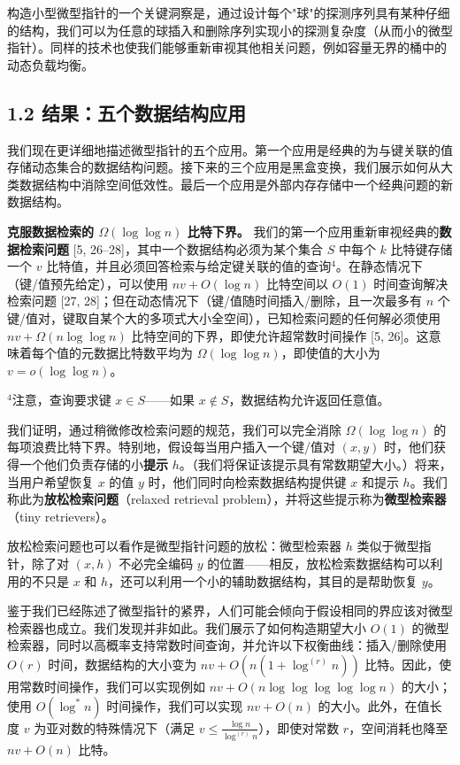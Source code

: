 \documentclass[12pt,a4paper]{ctexart}
\theoremstyle{remark}
\begin{document}
构造小型微型指针的一个关键洞察是，通过设计每个"球"的探测序列具有某种仔细的结构，我们可以为任意的球插入和删除序列实现小的探测复杂度（从而小的微型指针）。同样的技术也使我们能够重新审视其他相关问题，例如容量无界的桶中的动态负载均衡。

\subsection{1.2 结果：五个数据结构应用}
我们现在更详细地描述微型指针的五个应用。第一个应用是经典的为与键关联的值存储动态集合的数据结构问题。接下来的三个应用是黑盒变换，我们展示如何从大类数据结构中消除空间低效性。最后一个应用是外部内存存储中一个经典问题的新数据结构。

\textbf{克服数据检索的 $\Omega(\log\log n)$ 比特下界。} 我们的第一个应用重新审视经典的\textbf{数据检索问题} [5, 26–28]，其中一个数据结构必须为某个集合 $S$ 中每个 $k$ 比特键存储一个 $v$ 比特值，并且必须回答检索与给定键关联的值的查询$^4$。在静态情况下（键/值预先给定），可以使用 $nv+O(\log n)$ 比特空间以 $O(1)$ 时间查询解决检索问题 [27, 28]；但在动态情况下（键/值随时间插入/删除，且一次最多有 $n$ 个键/值对，键取自某个大的多项式大小全空间），已知检索问题的任何解必须使用 $nv+\Omega(n\log\log n)$ 比特空间的下界，即使允许超常数时间操作 [5, 26]。这意味着每个值的元数据比特数平均为 $\Omega(\log\log n)$，即使值的大小为 $v=o(\log\log n)$。

$^4$注意，查询要求键 $x\in S$——如果 $x\notin S$，数据结构允许返回任意值。

我们证明，通过稍微修改检索问题的规范，我们可以完全消除 $\Omega(\log\log n)$ 的每项浪费比特下界。特别地，假设每当用户插入一个键/值对 $(x,y)$ 时，他们获得一个他们负责存储的小\textbf{提示} $h$。（我们将保证该提示具有常数期望大小。）将来，当用户希望恢复 $x$ 的值 $y$ 时，他们同时向检索数据结构提供键 $x$ 和提示 $h$。我们称此为\textbf{放松检索问题}（relaxed retrieval problem），并将这些提示称为\textbf{微型检索器}（tiny retrievers）。

放松检索问题也可以看作是微型指针问题的放松：微型检索器 $h$ 类似于微型指针，除了对 $(x,h)$ 不必完全编码 $y$ 的位置——相反，放松检索数据结构可以利用的不只是 $x$ 和 $h$，还可以利用一个小的辅助数据结构，其目的是帮助恢复 $y$。

鉴于我们已经陈述了微型指针的紧界，人们可能会倾向于假设相同的界应该对微型检索器也成立。我们发现并非如此。我们展示了如何构造期望大小 $O(1)$ 的微型检索器，同时以高概率支持常数时间查询，并允许以下权衡曲线：插入/删除使用 $O(r)$ 时间，数据结构的大小变为 $nv+O(n(1+\log^{(r)}n))$ 比特。因此，使用常数时间操作，我们可以实现例如 $nv+O(n\log\log\log\log\log n)$ 的大小；使用 $O(\log^* n)$ 时间操作，我们可以实现 $nv+O(n)$ 的大小。此外，在值长度 $v$ 为亚对数的特殊情况下（满足 $v\leq\frac{\log n}{\log^{(r)}n}$），即使对常数 $r$，空间消耗也降至 $nv+O(n)$ 比特。
\end{document}
